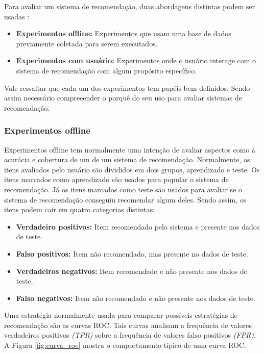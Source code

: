 Para avaliar um sistema de recomendação, duas abordagens distintas podem ser
usadas \cite{herlocker2004evaluating}:

\begin{itemize}
    \item \textbf{Experimentos offline: } Experimentos que usam uma base de
        dados previamente coletada para serem executados.
    \item \textbf{Experimentos com usuário: } Experimentos onde o usuário
        interage com o sistema de recomendação com algum propósito específico.
\end{itemize}

Vale ressaltar que cada um dos experimentos tem papéis bem definidos. Sendo
assim necessário compreeender o porquê do seu uso para avaliar sistemas de
recomendação.

\subsubsection{Experimentos offline}

Experimentos offline tem normalmente uma intenção de avaliar aspectos como à
acurácia e cobertura de um de um sistema de recomendação. Normalmente, os itens
avaliados pelo usuário são divididos em dois grupos, aprendizado e teste. Os
itens marcados como aprendizado são usados para popular o sistema de
recomendação. Já os itens marcados como teste são usados para avaliar se o
sistema de recomendação conseguiu recomendar algum deles. Sendo assim, os itens
podem cair em quatro categorias distintas:

\begin{itemize}
    \item \textbf{Verdadeiro positivos: } Item recomendado pelo sistema e
        presente nos dados de teste.
    \item \textbf{Falso positivos: } Item não recomendado, mas presente no dados
        de teste.
    \item \textbf{Verdadeiros negativos: } Item recomendado e não presente
        nos dados de teste.
    \item \textbf{Falso negativos: } Item não recomendado e não presente nos
        dados de teste.
\end{itemize}

Uma estratégia normalmente usada para comparar possíveis estratégias de
recomendação são as curvas ROC. Tais curvas analisam a frequência de valores
verdadeiros positivos \textit{(TPR)} sobre a frequência de valores falso
positivos \textit{(FPR)}. A Figura
\ref{fig:curva_roc} mostra o comportamento típico de uma curva ROC.

